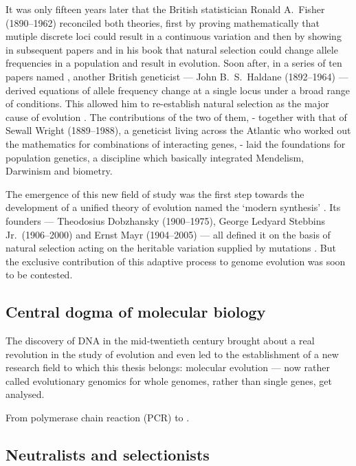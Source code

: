 It was only fifteen years later that the British statistician Ronald A.\ Fisher (1890--1962) reconciled both theories, first by proving mathematically that mutiple discrete loci could result in a continuous variation \citep{fisher1919xv} and then by showing in subsequent papers and in his book \citep{fisher1930genetical} that natural selection could change allele frequencies in a population and result in evolution.
Soon after, in a series of ten papers named \citep{haldane1927mathematical}, another British geneticist — John B.\ S.\ Haldane (1892--1964) — derived equations of allele frequency change at a single locus under a broad range of conditions.
This allowed him to re-establish natural selection as the major cause of evolution \citep{haldane1932causes}.
The contributions of the two of them, - together with that of Sewall Wright (1889--1988), a geneticist living across the Atlantic who worked out the mathematics for combinations of interacting genes, - laid the foundations for population genetics, a discipline which basically integrated Mendelism, Darwinism and biometry.

The emergence of this new field of study was the first step towards the development of a unified theory of evolution named the ‘modern synthesis’ \citep{huxley1942evolution}. 
Its founders — Theodosius Dobzhansky (1900--1975), George Ledyard Stebbins Jr.\ (1906--2000) and Ernst Mayr (1904--2005) — all defined it on the basis of natural selection acting on the heritable variation supplied by mutations \citep{mayr1959where,stebbins1966processes,dobzhansky1974chance}.
But the exclusive contribution of this adaptive process to genome evolution was soon to be contested.

\subsection{Central dogma of molecular biology}

The discovery of \acrshort{DNA} in the mid-twentieth century \citep{franklin1953molecular,watson1953molecular,wilkins1953molecular} brought about a real revolution in the study of evolution and even led to the establishment of a new research field to which this thesis belongs: molecular evolution — now rather called evolutionary genomics for whole genomes, rather than single genes, get analysed.

From polymerase chain reaction (PCR) to .

\subsection{Neutralists and selectionists}

